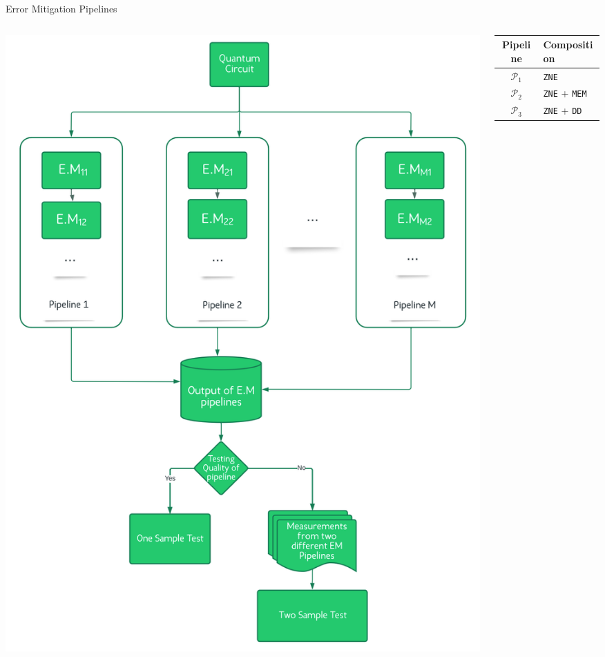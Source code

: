 \documentclass[11pt,aspectratio=1610,xcolor=dvipsnames]{beamer}
\begin{document}
\begin{frame}{Error Mitigation Pipelines}
	\begin{columns}
		\begin{column}{0.5\textwidth}
			\begin{center}
				\includegraphics[height=0.9\textheight]{pipeline.png}
			\end{center}
		\end{column}
		\begin{column}{0.5\textwidth}
			\begin{table}[h]
				\centering\begin{tabular}{c l}
					Pipeline        & Composition                                             \\ \toprule
					$\mathcal{P}_1$ & \texttt{ZNE}                                            \\
					$\mathcal{P}_2$ & \texttt{ZNE} + \texttt{MEM}                             \\
					$\mathcal{P}_3$ & \texttt{ZNE} + \texttt{DD}                              \\

\end{tabular}
\end{table}
\end{column}
\end{columns}
\end{frame}
\end{document}
